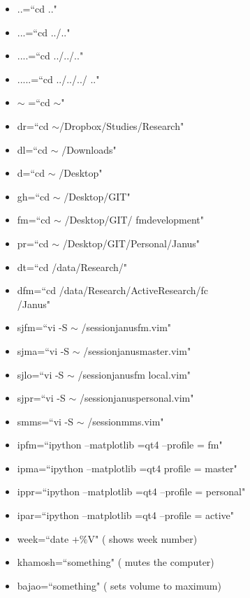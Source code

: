 \documentclass[twoside,a4paper]{article}
\newcommand{\tcb}{\color{blue}}
\newcommand{\tcr}{\color{red}}
\newcommand{\tcg}{\color{gray}}
\newcommand{\tck}{\color{black}}
\begin{document}
\begin{multicols}{2}
	\begin{itemize}
		\item \tcr ..\tck =\tcb ``cd .."
		\item \tcr ...\tck =\tcb ``cd ../.."
		\item \tcr ....\tck =\tcb ``cd ../../.."
		\item \tcr .....\tck =\tcb ``cd ../../../
		.."
		\item \tcr $\sim$ \tck =\tcb ``cd $\sim$"
		\item \tcr dr\tck =\tcb ``cd 
		$\sim$/Dropbox/Studies/Research"
		\item \tcr dl\tck =\tcb ``cd $\sim$
		/Downloads"
		\item \tcr d\tck =\tcb ``cd $\sim$
		/Desktop"
		\item \tcr gh\tck =\tcb ``cd $\sim$
		/Desktop/GIT"
		\item \tcr fm\tck =\tcb ``cd $\sim$
		/Desktop/GIT/
		fm\textunderscore development"
		\item \tcr pr\tck =\tcb ``cd $\sim$
		/Desktop/GIT/Personal/Janus"
		\item \tcr dt\tck =\tcb ``cd 
		/data/Research/"
		\item \tcr dfm\tck =\tcb ``cd 
		/data/Research/Active\textunderscore Research/fc \\
		/Janus"
		\item \tcr sjfm\tck =\tcb ``vi -S $\sim$
		/session\textunderscore janus\textunderscore fm.vim"
		\item \tcr sjma\tck =\tcb ``vi -S $\sim$
		/session\textunderscore janus\textunderscore master.vim"
		\item \tcr sjlo\tck =\tcb ``vi -S $\sim$
		/session\textunderscore janus\textunderscore fm\textunderscore
		local.vim"
		\item \tcr sjpr\tck =\tcb ``vi -S $\sim$
		/session\textunderscore janus\textunderscore personal.vim"
		\item \tcr smms\tck =\tcb ``vi -S $\sim$
		/session\textunderscore mms.vim"
		\item \tcr ipfm\tck =\tcb ``ipython 
		--matplotlib =qt4 --profile = fm"
		\item \tcr ipma\tck =\tcb ``ipython 
		--matplotlib =qt4 profile = master"
		\item \tcr ippr\tck =\tcb ``ipython 
		--matplotlib =qt4 --profile = personal"
		\item \tcr ipar\tck =\tcb ``ipython 
		--matplotlib =qt4 --profile = active"
		\item \tcr week\tck =\tcb ``date +$\%$V" 
		\tcg  ( shows week number)
		\item \tcr khamosh\tck =\tcb ``something" 
		\tcg  ( mutes the computer)
		\item \tcr bajao\tck =\tcb ``something" 
		\tcg  ( sets volume to maximum)
	\end{itemize}
\vfill \eject

\end{multicols}
\newpage
\tableofcontents
\end{document}
